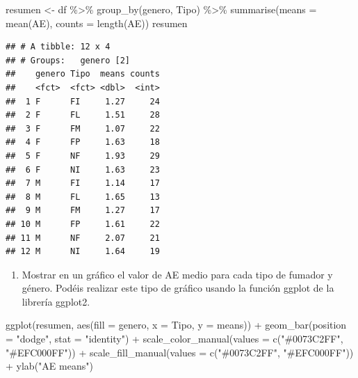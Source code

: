 \documentclass[
]{article}
\newenvironment{Shaded}{\begin{snugshade}}{\end{snugshade}}
\newcommand{\AttributeTok}[1]{\textcolor[rgb]{0.77,0.63,0.00}{#1}}
\newcommand{\FunctionTok}[1]{\textcolor[rgb]{0.00,0.00,0.00}{#1}}
\newcommand{\NormalTok}[1]{#1}
\newcommand{\OtherTok}[1]{\textcolor[rgb]{0.56,0.35,0.01}{#1}}
\newcommand{\SpecialCharTok}[1]{\textcolor[rgb]{0.00,0.00,0.00}{#1}}
\newcommand{\StringTok}[1]{\textcolor[rgb]{0.31,0.60,0.02}{#1}}
\providecommand{\tightlist}{%
  \setlength{\itemsep}{0pt}\setlength{\parskip}{0pt}}
\begin{document}
\vspace{0.3cm}

\begin{Shaded}
\begin{Highlighting}[]
\NormalTok{resumen }\OtherTok{\textless{}{-}}\NormalTok{ df }\SpecialCharTok{\%\textgreater{}\%}
    \FunctionTok{group\_by}\NormalTok{(genero, Tipo) }\SpecialCharTok{\%\textgreater{}\%}
    \FunctionTok{summarise}\NormalTok{(}\AttributeTok{means =} \FunctionTok{mean}\NormalTok{(AE), }\AttributeTok{counts =} \FunctionTok{length}\NormalTok{(AE))}
\NormalTok{resumen}
\end{Highlighting}
\end{Shaded}

\begin{verbatim}
## # A tibble: 12 x 4
## # Groups:   genero [2]
##    genero Tipo  means counts
##    <fct>  <fct> <dbl>  <int>
##  1 F      FI     1.27     24
##  2 F      FL     1.51     28
##  3 F      FM     1.07     22
##  4 F      FP     1.63     18
##  5 F      NF     1.93     29
##  6 F      NI     1.63     23
##  7 M      FI     1.14     17
##  8 M      FL     1.65     13
##  9 M      FM     1.27     17
## 10 M      FP     1.61     22
## 11 M      NF     2.07     21
## 12 M      NI     1.64     19
\end{verbatim}

\vspace{0.3cm}

\begin{enumerate}
\def\labelenumi{\arabic{enumi}.}
\setcounter{enumi}{1}
\tightlist
\item
  Mostrar en un gráfico el valor de AE medio para cada tipo de fumador y
  género. Podéis realizar este tipo de gráfico usando la función ggplot
  de la librería ggplot2.
\end{enumerate}

\vspace{0.3cm}

\begin{Shaded}
\begin{Highlighting}[]
\FunctionTok{ggplot}\NormalTok{(resumen, }\FunctionTok{aes}\NormalTok{(}\AttributeTok{fill =}\NormalTok{ genero, }\AttributeTok{x =}\NormalTok{ Tipo, }\AttributeTok{y =}\NormalTok{ means)) }\SpecialCharTok{+} \FunctionTok{geom\_bar}\NormalTok{(}\AttributeTok{position =} \StringTok{"dodge"}\NormalTok{,}
    \AttributeTok{stat =} \StringTok{"identity"}\NormalTok{) }\SpecialCharTok{+} \FunctionTok{scale\_color\_manual}\NormalTok{(}\AttributeTok{values =} \FunctionTok{c}\NormalTok{(}\StringTok{"\#0073C2FF"}\NormalTok{,}
    \StringTok{"\#EFC000FF"}\NormalTok{)) }\SpecialCharTok{+} \FunctionTok{scale\_fill\_manual}\NormalTok{(}\AttributeTok{values =} \FunctionTok{c}\NormalTok{(}\StringTok{"\#0073C2FF"}\NormalTok{,}
    \StringTok{"\#EFC000FF"}\NormalTok{)) }\SpecialCharTok{+} \FunctionTok{ylab}\NormalTok{(}\StringTok{"AE means"}\NormalTok{)}
\end{Highlighting}
\end{Shaded}
\end{document}

